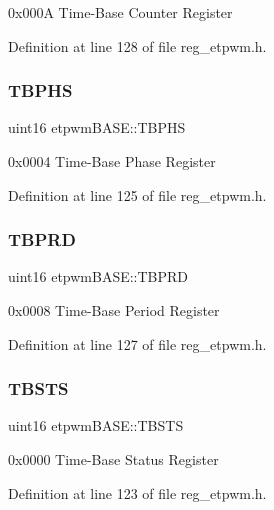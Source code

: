 0x000A Time-\/\+Base Counter Register 

Definition at line 128 of file reg\+\_\+etpwm.\+h.

\mbox{\label{structetpwmBASE_a8bade60a48e3c6df6bc762d99917b2d3}} 
\subsubsection{\texorpdfstring{T\+B\+P\+HS}{TBPHS}}
{\footnotesize\ttfamily uint16 etpwm\+B\+A\+S\+E\+::\+T\+B\+P\+HS}

0x0004 Time-\/\+Base Phase Register 

Definition at line 125 of file reg\+\_\+etpwm.\+h.

\mbox{\label{structetpwmBASE_a17f25e1aeadd46e29779c042f38f9ee1}} 
\subsubsection{\texorpdfstring{T\+B\+P\+RD}{TBPRD}}
{\footnotesize\ttfamily uint16 etpwm\+B\+A\+S\+E\+::\+T\+B\+P\+RD}

0x0008 Time-\/\+Base Period Register 

Definition at line 127 of file reg\+\_\+etpwm.\+h.

\mbox{\label{structetpwmBASE_ae041121b40c53260426f11aed6f8f8ef}} 
\subsubsection{\texorpdfstring{T\+B\+S\+TS}{TBSTS}}
{\footnotesize\ttfamily uint16 etpwm\+B\+A\+S\+E\+::\+T\+B\+S\+TS}

0x0000 Time-\/\+Base Status Register 

Definition at line 123 of file reg\+\_\+etpwm.\+h.

\mbox{\label{structetpwmBASE_ae347d9372add62650a81204c7b6f40c3}} 
